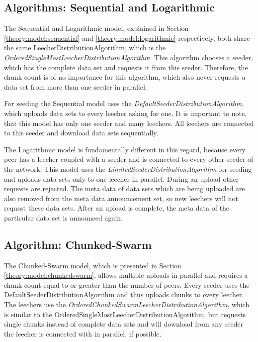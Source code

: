 \subsection{Algorithms: Sequential and Logarithmic}
\label{module:algorithm:seqlog}
The Sequential and Logarithmic model, explained in Section \ref{theory:model:sequential} and \ref{theory:model:logarithmic} respectively, both share the same LeecherDistributionAlgorithm, which is the \emph{OrderedSingleMostLeecherDistributionAlgorithm}. This algorithm chooses a seeder, which has the complete data set and requests it from this seeder. Therefore, the chunk count is of no importance for this algorithm, which also never requests a data set from more than one seeder in parallel.

For seeding the Sequential model uses the \emph{DefaultSeederDistributionAlgorithm}, which uploads data sets to every leecher asking for one. It is important to note, that this model has only one seeder and many leechers. All leechers are connected to this seeder and download data sets sequentially. 

The Logarithmic model is fundamentally different in this regard, because every peer has a leecher coupled with a seeder and is connected to every other seeder of the network. This model uses the \emph{LimitedSeederDistributionAlgorithm} for seeding and uploads data sets only to one leecher in parallel. During an upload other requests are rejected. The meta data of data sets which are being uploaded are also removed from the meta data announcement set, so new leechers will not request these data sets. After an upload is complete, the meta data of the particular data set is announced again.

\subsection{Algorithm: Chunked-Swarm}
\label{module:algorithm:chunkedswarm}
The Chunked-Swarm model, which is presented in Section \ref{theory:model:chunkedswarm}, allows multiple uploads in parallel and requires a chunk count equal to or greater than the number of peers. Every seeder uses the DefaultSeederDistributionAlgorithm and thus uploads chunks to every leecher. The leechers use the \emph{OrderedChunkedSwarmLeecherDistributionAlgorithm}, which is similar to the OrderedSingleMostLeecherDistributionAlgorithm, but requests single chunks instead of complete data sets and will download from any seeder the leecher is connected with in parallel, if possible. 

